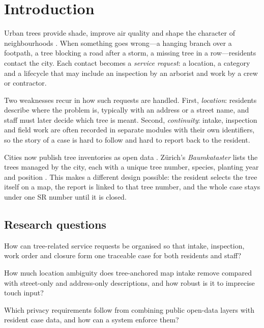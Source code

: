 \documentclass[11pt,a4paper]{article}
\begin{document}
\section{Introduction}
\label{sec:intro}

Urban trees provide shade, improve air quality and shape the character of neighbourhoods \cite{beatley2011,escobedo2011}. When something goes wrong---a hanging branch over a footpath, a tree blocking a road after a storm, a missing tree in a row---residents contact the city. Each contact becomes a \emph{service request}: a location, a category and a lifecycle that may include an inspection by an arborist and work by a crew or contractor.

Two weaknesses recur in how such requests are handled. First, \emph{location}: residents describe where the problem is, typically with an address or a street name, and staff must later decide which tree is meant. Second, \emph{continuity}: intake, inspection and field work are often recorded in separate modules with their own identifiers, so the story of a case is hard to follow and hard to report back to the resident.

Cities now publish tree inventories as open data \cite{janssen2012}. Zürich's \emph{Baumkataster} lists the trees managed by the city, each with a unique tree number, species, planting year and position \cite{zh-baum}. This makes a different design possible: the resident selects the tree itself on a map, the report is linked to that tree number, and the whole case stays under one SR number until it is closed.

\subsection{Research questions}

\begin{description}[leftmargin=2.6em,style=nextline]
  \item[RQ1] How can tree-related service requests be organised so that intake, inspection, work order and closure form one traceable case for both residents and staff?
  \item[RQ2] How much location ambiguity does tree-anchored map intake remove compared with street-only and address-only descriptions, and how robust is it to imprecise touch input?
  \item[RQ3] Which privacy requirements follow from combining public open-data layers with resident case data, and how can a system enforce them?
\end{description}
\end{document}
